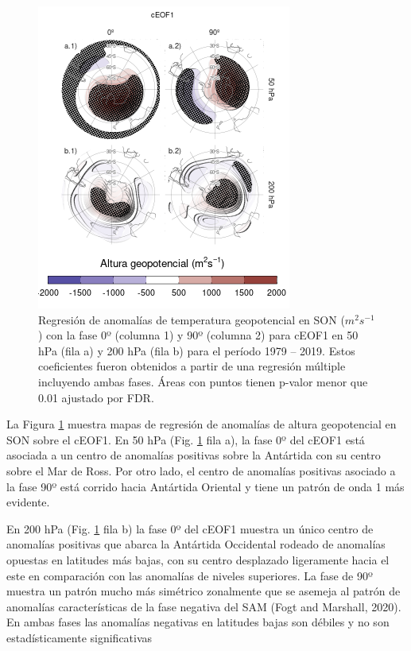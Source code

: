 \documentclass[12pt,oneside]{reedthesis}
\begin{document}
\begin{figure}
\includegraphics{figures/20-ceofs/eof1-regr-gh-1} \caption{Regresión de anomalías de temperatura geopotencial en SON (\(m^2s^{-1}\)) con la fase 0º (columna 1) y 90º (columna 2) para cEOF1 en 50 hPa (fila a) y 200 hPa (fila b) para el período 1979 -- 2019.
Estos coeficientes fueron obtenidos a partir de una regresión múltiple incluyendo ambas fases.
Áreas con puntos tienen p-valor menor que 0.01 ajustado por FDR.}\label{fig:eof1-regr-gh}
\end{figure}

La Figura \ref{fig:eof1-regr-gh} muestra mapas de regresión de anomalías de altura geopotencial en SON sobre el cEOF1.
En 50 hPa (Fig. \ref{fig:eof1-regr-gh} fila a), la fase 0º del cEOF1 está asociada a un centro de anomalías positivas sobre la Antártida con su centro sobre el Mar de Ross.
Por otro lado, el centro de anomalías positivas asociado a la fase 90º está corrido hacia Antártida Oriental y tiene un patrón de onda 1 más evidente.

En 200 hPa (Fig. \ref{fig:eof1-regr-gh} fila b) la fase 0º del cEOF1 muestra un único centro de anomalías positivas que abarca la Antártida Occidental rodeado de anomalías opuestas en latitudes más bajas, con su centro desplazado ligeramente hacia el este en comparación con las anomalías de niveles superiores.
La fase de 90º muestra un patrón mucho más simétrico zonalmente que se asemeja al patrón de anomalías características de la fase negativa del SAM (Fogt and Marshall, 2020).
En ambas fases las anomalías negativas en latitudes bajas son débiles y no son estadísticamente significativas
\end{document}
